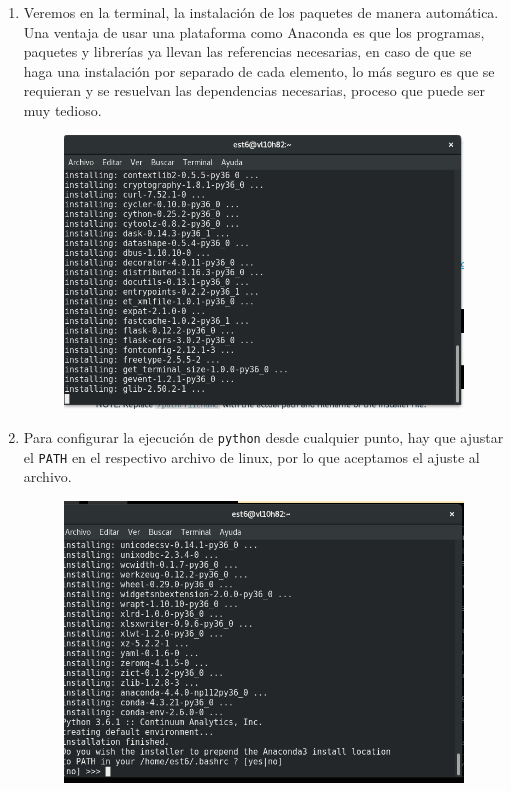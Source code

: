 \documentclass[12pt]{article}
\begin{document}
\begin{enumerate}
\item Veremos en la terminal, la instalación de los paquetes de manera automática. Una ventaja de usar una plataforma como Anaconda es que los programas, paquetes y librerías ya llevan las referencias necesarias, en caso de que se haga una instalación por separado de cada elemento, lo más seguro es que se requieran y se resuelvan las dependencias necesarias, proceso que puede ser muy tedioso.
\begin{figure}[H]
 	\centering
 	\includegraphics[scale=0.35]{Imagenes/Instalacion_Anaconda_01_linux_08}
\end{figure}
\item Para configurar la ejecución de \texttt{python} desde cualquier punto, hay que ajustar el \texttt{PATH} en el respectivo archivo de linux, por lo que aceptamos el ajuste al archivo.
\begin{figure}[H]
 	\centering
 	\includegraphics[scale=0.35]{Imagenes/Instalacion_Anaconda_01_linux_09}

\end{figure}
\end{enumerate}
\end{document}
